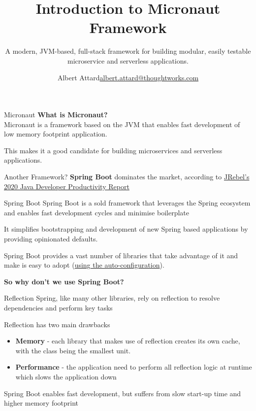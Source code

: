 \documentclass{beamer}
\title[Micronaut]{Introduction to Micronaut Framework}
\subtitle{A modern, JVM-based, full-stack framework for building modular, easily testable microservice and serverless applications.}
\author{\texorpdfstring{Albert Attard\newline\url{albert.attard@thoughtworks.com}}{Albert Attard}}
\institute{\large \href{https://thoughtworks.com}{\textbf{ThoughtWorks}.com}}
\date{}
\begin{document}

  \begin{frame}
    \titlepage
  \end{frame}


  \begin{frame}[t]{Micronaut}
    \textbf{What is Micronaut?}\\[6pt]
    Micronaut is a framework based on the JVM that enables fast development of low memory footprint application.

    This makes it a good candidate for building microservices and serverless applications.
  \end{frame}

  \begin{frame}[t]{Another Framework?}
    \textbf{Spring Boot} dominates the market, according to \href{https://www.jrebel.com/sites/rebel/files/pdfs/ebook-jrebel-java-productivity-report.pdf}{JRebel's 2020 Java Developer Productivity Report}


  \end{frame}


  \begin{frame}[t]{Spring Boot}
    Spring Boot is a sold framework that leverages the Spring ecosystem and enables fast development cycles and minimise boilerplate

    It simplifies bootstrapping and development of new Spring based applications by providing opinionated defaults.

    Spring Boot provides a vast number of libraries that take advantage of it and make is easy to adopt (\href{https://docs.spring.io/spring-boot/docs/2.0.0.M5/reference/html/boot-features-developing-auto-configuration.html}{using the auto-configuration}).

    \vspace{16pt}
    \textbf{So why don't we use Spring Boot?}
  \end{frame}


  \begin{frame}[t]{Reflection}
    Spring, like many other libraries, rely on reflection to resolve dependencies and perform key tasks

    Reflection has two main drawbacks
    \begin{itemize}
      \item \textbf{Memory} - each library that makes use of reflection creates its own cache, with the class being the smallest unit.
      \item \textbf{Performance} - the application need to perform all reflection logic at runtime which slows the application down
    \end{itemize}

    \vspace{16pt}
    Spring Boot enables fast development, but suffers from slow start-up time and higher memory footprint
  \end{frame}
\end{document}
